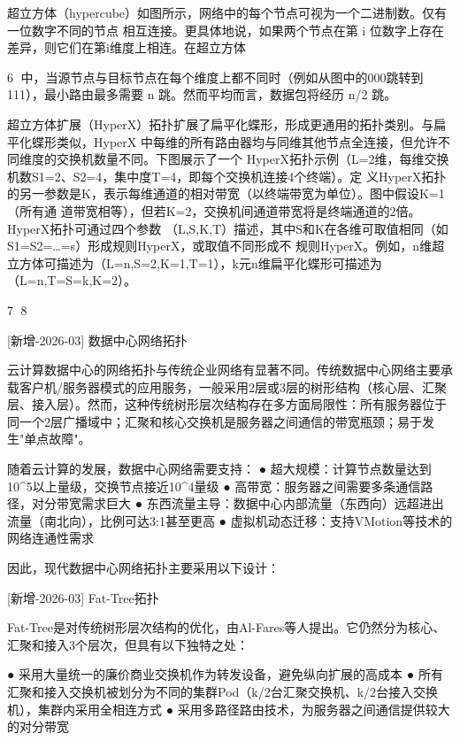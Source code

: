 超立方体（hypercube）如图所示，网络中的每个节点可视为一个二进制数。仅有一位数字不同的节点
相互连接。更具体地说，如果两个节点在第 i 位数字上存在差异，则它们在第i维度上相连。在超立方体

                                                                                     6
中，当源节点与目标节点在每个维度上都不同时（例如从图中的000跳转到111），最小路由最多需要
n   跳。然而平均而言，数据包将经历 n/2 跳。




超立方体扩展（HyperX）拓扑扩展了扁平化蝶形，形成更通用的拓扑类别。与扁平化蝶形类似，HyperX
中每维的所有路由器均与同维其他节点全连接，但允许不同维度的交换机数量不同。下图展示了一个
HyperX拓扑示例（L=2维，每维交换机数S1=2、S2=4，集中度T=4，即每个交换机连接4个终端）。定
义HyperX拓扑的另一参数是K，表示每维通道的相对带宽（以终端带宽为单位）。图中假设K=1（所有通
道带宽相等），但若K=2，交换机间通道带宽将是终端通道的2倍。HyperX拓扑可通过四个参数
（L,S,K,T）描述，其中S和K在各维可取值相同（如S1=S2=…=s）形成规则HyperX，或取值不同形成不
规则HyperX。例如，n维超立方体可描述为（L=n,S=2,K=1,T=1），k元n维扁平化蝶形可描述为
（L=n,T=S=k,K=2）。




                                                       7
8


[新增-2026-03] 数据中心网络拓扑

云计算数据中心的网络拓扑与传统企业网络有显著不同。传统数据中心网络主要承载客户机/服务器模式的应用服务，一般采用2层或3层的树形结构（核心层、汇聚层、接入层）。然而，这种传统树形层次结构存在多方面局限性：所有服务器位于同一个2层广播域中；汇聚和核心交换机是服务器之间通信的带宽瓶颈；易于发生"单点故障"。

随着云计算的发展，数据中心网络需要支持：
 ● 超大规模：计算节点数量达到10^5以上量级，交换节点接近10^4量级
 ● 高带宽：服务器之间需要多条通信路径，对分带宽需求巨大
 ● 东西流量主导：数据中心内部流量（东西向）远超进出流量（南北向），比例可达3:1甚至更高
 ● 虚拟机动态迁移：支持VMotion等技术的网络连通性需求

因此，现代数据中心网络拓扑主要采用以下设计：

[新增-2026-03] Fat-Tree拓扑

Fat-Tree是对传统树形层次结构的优化，由Al-Fares等人提出。它仍然分为核心、汇聚和接入3个层次，但具有以下独特之处：

 ● 采用大量统一的廉价商业交换机作为转发设备，避免纵向扩展的高成本
 ● 所有汇聚和接入交换机被划分为不同的集群Pod（k/2台汇聚交换机、k/2台接入交换机），集群内采用全相连方式
 ● 采用多路径路由技术，为服务器之间通信提供较大的对分带宽

